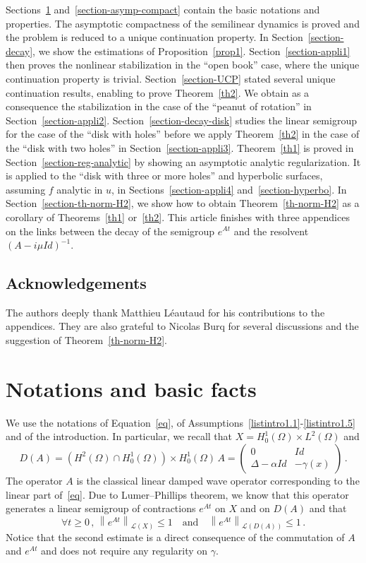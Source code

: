 \documentclass[10pt]{amsart}
\theoremstyle{definition}\newtheorem{defi}[theo]{Definition}\newtheorem{rema}[theo]{Remark}\newtheorem{exam}[theo]{Example}\newtheorem{exem}[theo]{Example}\newtheorem{nota}[theo]{Notation}
\newcommand{\Lc}{\mathcal{L}}
\let\oldforall\forall
\renewcommand*{\forall}{\mathrel{\oldforall}}
\begin{document}
Sections~\ref{section-basic} and~\ref{section-asymp-compact} contain the basic notations and properties. The asymptotic compactness of the semilinear dynamics is proved and the problem is reduced to a unique continuation property. In Section~\ref{section-decay}, we show the estimations of Proposition~\ref{prop1}. Section~\ref{section-appli1} then proves the nonlinear stabilization in the ``open book'' case, where the unique continuation property is trivial. Section~\ref{section-UCP} stated several unique continuation results, enabling to prove Theorem~\ref{th2}. We obtain as a consequence the stabilization in the case of the ``peanut of rotation'' in Section~\ref{section-appli2}. Section~\ref{section-decay-disk} studies the linear semigroup for the case of the ``disk with holes'' before we apply Theorem~\ref{th2} in the case of the ``disk with two holes'' in Section~\ref{section-appli3}. Theorem~\ref{th1} is proved in Section~\ref{section-reg-analytic} by showing an asymptotic analytic regularization. It is applied to the ``disk with three or more holes'' and hyperbolic surfaces, assuming $f$ analytic in $u$, in Sections~\ref{section-appli4} and~\ref{section-hyperbo}. In Section~\ref{section-th-norm-H2}, we show how to obtain Theorem~\ref{th-norm-H2} as a corollary of Theorems~\ref{th1} or~\ref{th2}. This article finishes with three appendices on the links between the decay of the semigroup $e^{At}$ and the resolvent $(A-i\mu Id)^{-1}$.

\subsection*{Acknowledgements}
The authors deeply thank Matthieu Léautaud for his contributions to the appendices. They are also grateful to Nicolas Burq for several discussions and the suggestion of Theorem~\ref{th-norm-H2}.



\section{Notations and basic facts}\label{section-basic}
We use the notations of Equation~\eqref{eq}, of Assumptions~\eqref{listintro1.1}-\eqref{listintro1.5} and of the introduction. In particular, we recall that $X=H^1_0(\Omega)\times L^2(\Omega)$ and
\[
D(A)=\left(H^2(\Omega)\cap H^1_0(\Omega)\right)\times H^1_0(\Omega)\,
A =
\begin{pmatrix}
0 & Id \\ \Delta-\alpha Id & -\gamma(x)
\end{pmatrix}\,.
\]
The operator $A$ is the classical linear damped wave operator corresponding to the linear part of~\eqref{eq}. Due to Lumer--Phillips theorem, we know that this operator generates a linear semigroup of contractions $e^{At}$ on $X$ and on $D(A)$ and that
\[
\forall t\geq 0\,,\,\left\|e^{At}\right\|_{\Lc(X)}\leq 1\quad\text{and}\quad\left\|e^{At}\right\|_{\Lc(D(A))}\leq 1\,.
\]
Notice that the second estimate is a direct consequence of the commutation of $A$ and $e^{At}$ and does not require any regularity on $\gamma$.
\end{document}

